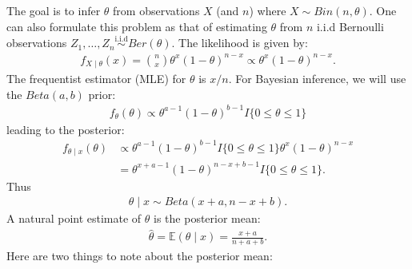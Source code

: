\documentclass{scrartcl}
\newcommand{\E}{{\mathbb E}}
\begin{document}
The goal is to infer $\theta$ from observations $X$ (and $n$) where $X
\sim Bin(n, \theta)$. One can also formulate this problem as that of
estimating $\theta$ from $n$ i.i.d Bernoulli observations $Z_1, \dots,
Z_n \overset{\text{i.i.d}}{\sim} Ber(\theta)$. The likelihood is given
by:
\begin{align*}
  f_{X \mid \theta}(x) = {n \choose x} \theta^x (1 - \theta)^{n-x}
  \propto \theta^{x} (1 - \theta)^{n-x}. 
\end{align*}
The frequentist estimator (MLE) for $\theta$ is $x/n$. For Bayesian
inference, we will use the $Beta(a, b)$ prior:
\begin{align*}
  f_{\theta}(\theta) \propto \theta^{a-1} (1 - \theta)^{b-1} I\{0 \leq
  \theta \leq 1\}
\end{align*}
leading to the posterior:
\begin{align*}
  f_{\theta \mid x}(\theta) &\propto \theta^{a-1} (1 - \theta)^{b-1} I\{0 \leq
                              \theta \leq 1\} \theta^{x} (1 - \theta)^{n-x} \\
  &= \theta^{x + a - 1} (1 - \theta)^{n-x + b - 1} I\{0 \leq \theta
    \leq 1\}. 
\end{align*}
Thus
\begin{align*}
  \theta \mid x \sim Beta(x + a, n-x + b). 
\end{align*}
A natural  point estimate of $\theta$ is the posterior mean:
\begin{align*}
  \hat{\theta} = \E(\theta \mid x) = \frac{x+a}{n + a + b}. 
\end{align*}
Here are two things to note about the posterior mean:
\end{document}
